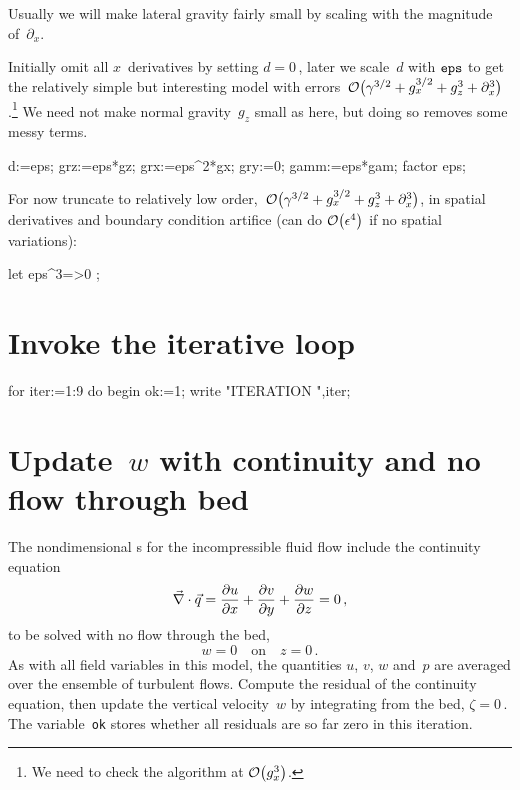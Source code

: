 \documentclass[12pt,a5paper]{article}
\newcommand{\zs}{\zeta}
\begin{document}
Usually we will make lateral gravity fairly small by scaling with the magnitude
of~$\partial_x$.

Initially omit all $x$~derivatives by setting $d=0$\,, later we
scale~$d$ with $\verb|eps|$ to get the relatively simple but interesting
model with errors~$\Ord{\gamma^{3/2}+g_x^{3/2}+g_z^3+\partial_x^3}$.\footnote{We need to check the algorithm at $\Ord{g_x^3}$.}  We need not make normal gravity~$g_z$ small as here, but doing so removes some messy terms.

\begin{reduce}
d:=eps;
grz:=eps*gz;
grx:=eps^2*gx;
gry:=0;
gamm:=eps*gam;
factor eps;
\end{reduce}

For now truncate to relatively low order,~$\Ord{\gamma^{3/2}+g_x^{3/2}+g_z^3+\partial_x^3}$, in spatial derivatives and boundary condition artifice (can do $\Ord{\epsilon^4}$ if no spatial variations):   

\begin{reduce}
let { eps^3=>0 };
\end{reduce}

\section{Invoke the iterative loop}
\begin{reduce}
for iter:=1:9 do begin ok:=1;
write "ITERATION ",iter;
\end{reduce}






\section{Update~$w$ with continuity and no flow through bed}

The nondimensional \pde{}s for the incompressible fluid flow include
the continuity equation
\begin{equation}
    \divv\vec q=\D xu+\D yv+\D zw=0\,,
\end{equation}
to be solved with no flow through the bed,
\begin{equation}
   w=0\quad\text{on}\quad z=0\,.
    \label{eq:nobed}
\end{equation}
As with all field variables in this model, the quantities $u$, $v$, $w$ and~$p$ are averaged over the ensemble of turbulent flows.
Compute the residual of the continuity equation, then update the
vertical velocity~$w$ by integrating from the bed, $\zs=0$\,.  The variable~\verb|ok| stores whether all residuals are so far zero in this iteration.
\end{document}
